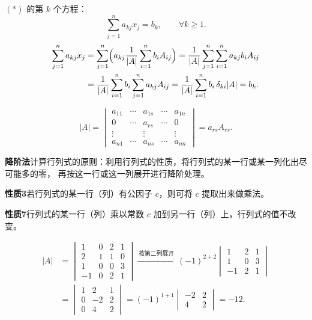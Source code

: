 \providecommand{\fitmath}[1]{\resizebox{\ifdim\width>\linewidth \linewidth\else\width\fi}{!}{#1}}


$(*)$ 的第 $k$ 个方程：
\[
\sum_{j=1}^{n}a_{kj}x_j=b_k,\qquad \forall k\ge 1.
\]
\begin{align*}
\sum_{j=1}^{n}a_{kj}x_j
&=\sum_{j=1}^{n}\Bigl(a_{kj}\frac{1}{|A|}\sum_{i=1}^{n}b_iA_{ij}\Bigr)
=\frac{1}{|A|}\sum_{j=1}^{n}\sum_{i=1}^{n}a_{kj}b_iA_{ij}\\
&=\frac{1}{|A|}\sum_{i=1}^{n}b_i\sum_{j=1}^{n}a_{kj}A_{ij}
=\frac{1}{|A|}\sum_{i=1}^{n}b_i\,\delta_{ki}|A|=b_k .
\end{align*}

\begin{example}
\[
|A|=\begin{vmatrix}
a_{11}&\cdots&a_{1s}&\cdots&a_{1n}\\
0&\cdots&a_{rs}&\cdots&0\\
\vdots& &\vdots& &\vdots\\
a_{n1}&\cdots&a_{ns}&\cdots&a_{nn}
\end{vmatrix}
=a_{rs}A_{rs}.
\]
\end{example}

\textbf{降阶法}\quad 计算行列式的原则：利用行列式的性质，将行列式的某一行或某一列化出尽可能多的零，
再按这一行或这一列展开进行降阶处理。

\textbf{性质3}\quad 若行列式的某一行（列）有公因子 $c$，则可将 $c$ 提取出来做乘法。

\textbf{性质7}\quad 行列式的某一行（列）乘以常数 $c$ 加到另一行（列）上，行列式的值不改变。

\begin{example}
\begin{align*}
|A|&=\begin{vmatrix}
1&0&2&1\\
2&\boxed{1}&1&0\\
1&0&0&3\\
-1&0&2&1
\end{vmatrix}
\xrightarrow{\ \text{按第二列展开}\ }
(-1)^{2+2}\begin{vmatrix}
1&2&1\\
1&0&3\\
-1&2&1
\end{vmatrix}\\
&=\begin{vmatrix}
1&2&1\\
0&-2&2\\
0&4&2
\end{vmatrix}
=(-1)^{1+1}\begin{vmatrix}
-2&2\\
4&2
\end{vmatrix}=-12.
\end{align*}
\end{example}

